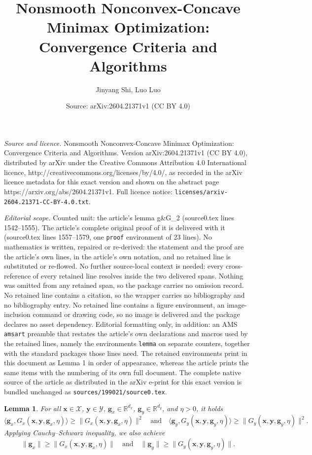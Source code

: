 \documentclass[10pt,a4paper]{amsart}
\title{Nonsmooth Nonconvex-Concave Minimax Optimization: Convergence Criteria and Algorithms}
\author{Jinyang Shi, Luo Luo}
\date{Source: arXiv:2604.21371v1 (CC BY 4.0)}
\newtheorem{lemma}{Lemma}
\def\BR{{\mathbb{R}}}
\def\fX{{\mathcal{X}}}
\def\fY{{\mathcal{Y}}}
\def\vg{\mathbf{g}}
\def\vx{\mathbf{x}}
\def\vy{\mathbf{y}}
\begin{document}
\maketitle

\noindent\emph{Source and licence.} Nonsmooth Nonconvex-Concave Minimax Optimization: Convergence Criteria and Algorithms. Version arXiv:2604.21371v1 (CC BY 4.0), distributed by arXiv under the Creative Commons Attribution 4.0 International licence, http://creativecommons.org/licenses/by/4.0/, as recorded in the arXiv licence metadata for this exact version and shown on the abstract page https://arxiv.org/abs/2604.21371v1. Full licence notice: \texttt{licenses/arxiv-2604.21371-CC-BY-4.0.txt}.\par\smallskip

\noindent\textit{Editorial scope.} Counted unit: the article's lemma g\&G\_2 (source0.tex lines 1542--1555). The article's complete original proof of it is delivered with it (source0.tex lines 1557--1579, one \texttt{proof} environment of 23 lines). No mathematics is written, repaired or re-derived: the statement and the proof are the article's own lines, in the article's own notation, and no retained line is substituted or re-flowed.  No further source-local context is needed: every cross-reference of every retained line resolves inside the two delivered spans.  Nothing was omitted from any retained span, so the package carries no omission record.  No retained line contains a citation, so the wrapper carries no bibliography and no bibliography entry.  No retained line contains a figure environment, an image-inclusion command or drawing code, so no image is delivered and the package declares no asset dependency.  Editorial formatting only, in addition: an AMS \texttt{amsart} preamble that restates the article's own declarations and macros used by the retained lines, namely the environments \texttt{lemma} on separate counters, together with the standard packages those lines need.  The retained environments print in this document as Lemma 1 in order of appearance, whereas the article prints the same items with the numbering of its own full document.  The complete native source of the article as distributed in the arXiv e-print for this exact version is bundled unchanged as \texttt{sources/199021/source0.tex}.
\begin{lemma}\label{lemma: g&G_2}
For all $\vx\in\fX$, $\vy\in\fY$, $\vg_x\in\BR^{d_x}$, $\vg_y\in\BR^{d_y}$, and $\eta>0$, it holds
\[
\langle \vg_x, G_x(\vx,\vy, \vg_x, \eta) \rangle \geq \|G_x(\vx,\vy, \vg_x, \eta)\|^2
\quad\text{and}\quad
\langle \vg_y, G_y(\vx,\vy, \vg_y, \eta) \rangle \geq \|G_y(\vx,\vy, \vg_y, \eta)\|^2.
\]
Applying Cauchy--Schwarz inequality, we also achieve
\[
\|\vg_x\| \geq \|G_x(\vx,\vy, \vg_x, \eta)\|
\quad\text{and}\quad
\|\vg_y\| \geq \|G_y(\vx,\vy, \vg_y, \eta)\|.
\]
\end{lemma}
\end{document}
